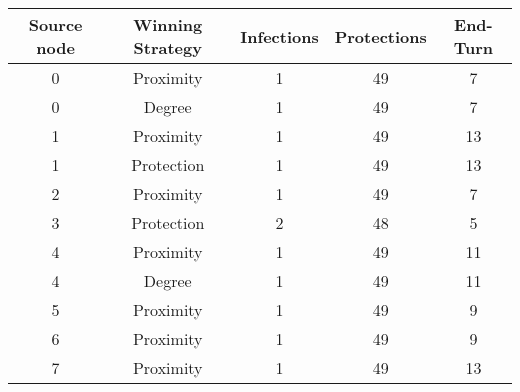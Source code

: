 \documentclass[results.tex]{subfiles}
\begin{document}
    \begin{center}
        \begin{tabular}{| c || c | c | c | c |}
            \hline
            {\bfseries Source node} & {\bfseries Winning Strategy} & {\bfseries Infections} & {\bfseries Protections}
            & {\bfseries End-Turn}
            \\  %
            \hline\hline
            0                       & Proximity                    & 1                      & 49                      & 7                    \\
            \hline
            0                       & Degree                       & 1                      & 49                      & 7                    \\
            \hline
            1                       & Proximity                    & 1                      & 49                      & 13                   \\
            \hline
            1                       & Protection                   & 1                      & 49                      & 13                   \\
            \hline
            2                       & Proximity                    & 1                      & 49                      & 7                    \\
            \hline
            3                       & Protection                   & 2                      & 48                      & 5                    \\
            \hline
            4                       & Proximity                    & 1                      & 49                      & 11                   \\
            \hline
            4                       & Degree                       & 1                      & 49                      & 11                   \\
            \hline
            5                       & Proximity                    & 1                      & 49                      & 9                    \\
            \hline
            6                       & Proximity                    & 1                      & 49                      & 9                    \\
            \hline
            7                       & Proximity                    & 1                      & 49                      & 13                   \\

\end{tabular}
\end{center}
\end{document}
